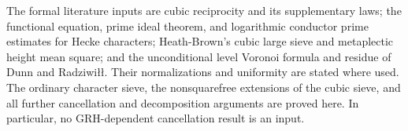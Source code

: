 \documentclass[11pt]{article}
\theoremstyle{definition}
\theoremstyle{remark}
\numberwithin{equation}{section}
\begin{document}
The formal literature inputs are cubic reciprocity and its supplementary
laws; the functional equation, prime ideal theorem, and logarithmic
conductor prime estimates for Hecke characters; Heath-Brown's cubic
large sieve and metaplectic height mean square; and the unconditional
level Voronoi formula and residue of Dunn and Radziwi\l\l.
Their normalizations and uniformity are stated where used. The ordinary
character sieve, the nonsquarefree extensions of the cubic sieve, and
all further cancellation and decomposition arguments are proved here.
In particular, no GRH-dependent cancellation result is an input.







\appendix

\end{document}
